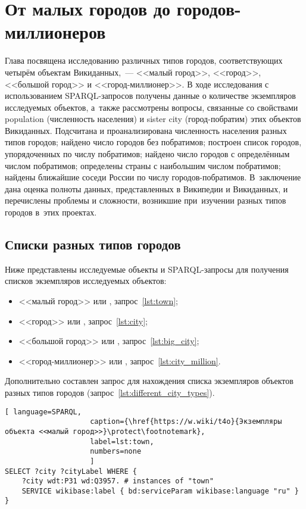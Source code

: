 \chapter{От малых городов до городов-миллионеров}
\label{ch:city}

Глава посвящена исследованию различных типов городов, 
соответствующих четырём объектам Викиданных,~--- 
<<малый город>>, <<город>>, <<большой город>> и <<город-миллионер>>. 
В ходе исследования с использованием SPARQL-запросов получены данные 
о количестве экземпляров исследуемых объектов, а~также рассмотрены вопросы, 
связанные со свойствами population (численность населения) и sister city (город-побратим) этих объектов Викиданных. 
Подсчитана и проанализирована численность населения разных типов городов; 
найдено число городов без побратимов; построен список городов, упорядоченных по числу побратимов; 
найдено число городов с определённым числом побратимов; 
определены страны с наибольшим числом побратимов; 
найдены ближайшие соседи России по числу городов-побратимов. 
В~заключение дана оценка полноты данных, представленных в Википедии и Викиданных, 
и перечислены проблемы и сложности, возникшие при~изучении разных типов городов в~этих проектах.
\section{Списки разных типов городов}

Ниже представлены исследуемые объекты и SPARQL-запросы для получения списков экземпляров исследуемых объектов: 
\begin{itemize}[leftmargin=24pt]
	\item <<малый город>> или , запрос~\ref{lst:town};
	\item <<город>> или , запрос~\ref{lst:city};
	\item <<большой город>> или , запрос~\ref{lst:big_city};
	\item <<город-миллионер>> или , запрос~\ref{lst:city_million}.
\end{itemize}

Дополнительно составлен запрос для нахождения списка экземпляров объектов разных типов городов (запрос~\ref{lst:different_city_types}).

\begin{lstlisting}[ language=SPARQL, 
                    caption={\href{https://w.wiki/t4o}{Экземпляры объекта <<малый город>>}\protect\footnotemark},
                    label=lst:town, 
                    numbers=none
                    ]
SELECT ?city ?cityLabel WHERE {
	?city wdt:P31 wd:Q3957. # instances of "town"
	SERVICE wikibase:label { bd:serviceParam wikibase:language "ru" }
}
\end{lstlisting}

